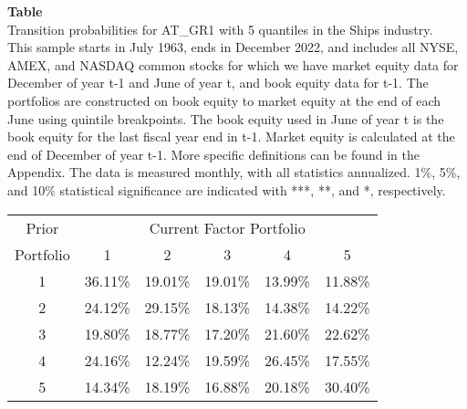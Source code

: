 \begin{table*}[ht!]
\raggedright
{}
\label{tab: transition_probs_AT_GR1_Ships_with_5_quantiles}
\textbf{Table \thetable} \\
Transition probabilities for AT_GR1 with 5 quantiles in the Ships industry. \\
\hspace*{1em}This sample starts in July 1963, ends in December 2022, and includes all NYSE, AMEX, and NASDAQ common stocks for which we have market equity data for December of year t-1 and June of year t, and book equity data for t-1. The portfolios are constructed on book equity to market equity at the end of each June using quintile breakpoints.  The book equity used in June of year t is the book equity for the last fiscal year end in t-1.  Market equity is calculated at the end of December of year t-1.  More specific definitions can be found in the Appendix.  The data is measured monthly, with all statistics annualized.  1\%, 5\%, and 10\% statistical significance are indicated with ***, **, and *, respectively. \\
\vspace{0.5em}
\centering
\begin{adjustbox}{max width=\textwidth}
\begin{tabular}{@{}cccccc@{}}
\toprule
Prior & \multicolumn{5}{c}{Current Factor Portfolio} \\
Portfolio & 1 & 2 & 3 & 4 & 5 \\
\midrule
1 & 36.11\% & 19.01\% & 19.01\% & 13.99\% & 11.88\% \\
2 & 24.12\% & 29.15\% & 18.13\% & 14.38\% & 14.22\% \\
3 & 19.80\% & 18.77\% & 17.20\% & 21.60\% & 22.62\% \\
4 & 24.16\% & 12.24\% & 19.59\% & 26.45\% & 17.55\% \\
5 & 14.34\% & 18.19\% & 16.88\% & 20.18\% & 30.40\% \\
\bottomrule
\end{tabular}
\end{adjustbox}
\end{table*}
